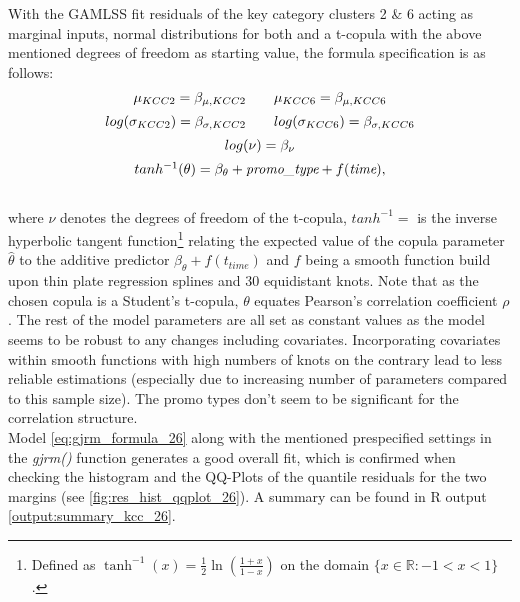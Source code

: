 With the \ac{GAMLSS} fit residuals of the key category clusters 2 \& 6 acting as marginal inputs, normal distributions for both and a t-copula with the above mentioned degrees of freedom as starting value, the formula specification is as follows: \\



\begin{equation}
\begin{array}{c}
\mu_{KCC 2}=\beta_{\mu,KCC2} \qquad \mu_{KCC 6}=\beta_{\mu,KCC6}  \\  \noalign{\vskip5pt}

log(\sigma_{KCC 2})=\beta_{\sigma,KCC2} \qquad log(\sigma_{KCC 6})=\beta_{\sigma,KCC6} \\  \noalign{\vskip5pt}

log(\nu) = \beta_{\nu} \\  \noalign{\vskip5pt}

tanh^{-1}(\theta)=\beta_{\theta} + \textit{promo\_type} +f(\textit{time}),
\end{array}
\label{eq:gjrm_formula_26}
\end{equation} \\

where $\nu$ denotes the degrees of freedom of the t-copula, $tanh^{-1} = $ is the inverse hyperbolic tangent function\footnote{Defined as $\tanh ^{-1} (x)=\frac{1}{2} \ln \left(\frac{1+x}{1-x}\right)$ on the domain $ \{ x \in \mathbb{R}:-1<x<1\}$.} relating the expected value of the copula parameter $\hat{\theta}$ to the additive predictor $\beta_{\theta}+f\left(t_{time}\right)$ and $f$ being a smooth function build upon thin plate regression splines and 30 equidistant knots. Note that as the chosen copula is a Student's t-copula, $\theta$ equates Pearson's correlation coefficient $\rho$. The rest of the model parameters are all set as constant values as the model seems to be robust to any changes including covariates. Incorporating covariates within smooth functions with high numbers of knots on the contrary lead to less reliable estimations (especially due to increasing number of parameters compared to this sample size). The promo types don't seem to be significant for the correlation structure. \\

Model \ref{eq:gjrm_formula_26} along with the mentioned prespecified settings in the \textit{gjrm()} function generates a good overall fit, which is confirmed when checking the histogram and the QQ-Plots of the quantile residuals for the two margins (see \autoref{fig:res_hist_qqplot_26}). A summary can be found in R output \ref{output:summary_kcc_26}.
\\


